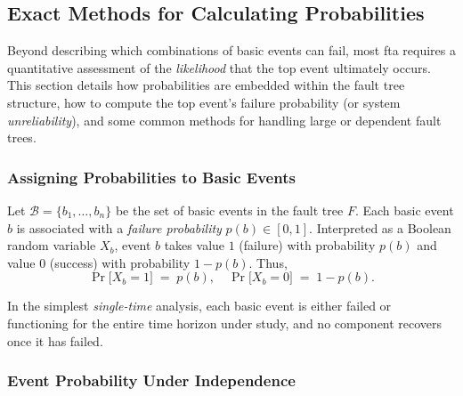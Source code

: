 \subsection{Exact Methods for Calculating Probabilities}

Beyond describing which combinations of basic events can fail, most \acrfull{fta} requires a quantitative assessment of the \emph{likelihood} that the top event ultimately occurs. This section details how probabilities are embedded within the fault tree structure, how to compute the top event’s failure probability (or system \emph{unreliability}), and some common methods for handling large or dependent fault trees.

\subsubsection{Assigning Probabilities to Basic Events}

Let \(\mathcal{B}=\{b_1, \dots, b_n\}\) be the set of basic events in the fault tree \(F\).  Each basic event \(b\) is associated with a \emph{failure probability} \(p(b)\in [0,1]\).  Interpreted as a Boolean random variable \(X_b\), event \(b\) takes value \(1\) (failure) with probability \(p(b)\) and value \(0\) (success) with probability \(1-p(b)\).  Thus, 
\[
\Pr\bigl[X_b = 1\bigr] \;=\; p(b), 
\quad
\Pr\bigl[X_b = 0\bigr] \;=\; 1-p(b).
\]

In the simplest \emph{single-time} analysis, each basic event is either failed or functioning for the entire time horizon under study, and no component recovers once it has failed.

\subsubsection{Event Probability Under Independence}

